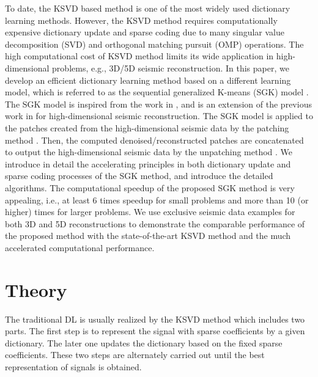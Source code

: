 To date, the KSVD based method is one of the most widely used dictionary learning methods. However, the KSVD method requires computationally expensive dictionary update and sparse coding due to many singular value decomposition (SVD) and orthogonal matching pursuit (OMP) operations. The high computational cost of KSVD method limits its wide application in high-dimensional problems, e.g., 3D/5D seismic reconstruction. In this paper, we develop an efficient dictionary learning method based on a different learning model, which is referred to as the sequential generalized K-means (SGK) model \cite{sgk2013,yangkang2020sgk}. The SGK model is inspired from the work in \cite{sgk2013}, and is an extension of the previous work in \cite{yangkang2020sgk} for high-dimensional seismic reconstruction. The SGK model is applied to the patches created from the high-dimensional seismic data by the patching method \cite{wanghang2020}. Then, the computed denoised/reconstructed patches are concatenated to output the high-dimensional seismic data by the unpatching method \cite{wanghang2020}. We introduce in detail the accelerating principles in both dictionary update and sparse coding processes of the SGK method, and introduce the detailed algorithms. The computational speedup of the proposed SGK method is very appealing, i.e., at least 6 times speedup for small problems and more than 10 (or higher) times for larger problems. We use exclusive seismic data examples for both 3D and 5D reconstructions to demonstrate the comparable performance of the proposed method with the state-of-the-art KSVD method and the much accelerated computational performance. 


\section{Theory}
The traditional DL is usually realized by the KSVD method which includes two parts. The first step is to represent the signal with sparse coefficients by a given dictionary. The later one updates the dictionary based on the fixed sparse coefficients. These two steps are alternately carried out until the best representation of signals is obtained.

